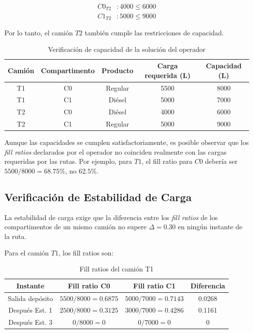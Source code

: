 \begin{align*}
C0_{T2} &: 4000 \leq 6000 \\
C1_{T2} &: 5000 \leq 9000
\end{align*}

Por lo tanto, el camión $T2$ también cumple las restricciones de capacidad.

\begin{table}[H]
\centering
\caption{Verificación de capacidad de la solución del operador}
\begin{tabular}{ccccc}
\toprule
Camión & Compartimento & Producto & Carga requerida (L) & Capacidad (L) \\
\midrule
T1 & C0 & Regular & 5500 & 8000 \\
T1 & C1 & Diésel & 5000 & 7000 \\
T2 & C0 & Diésel & 4000 & 6000 \\
T2 & C1 & Regular & 5000 & 9000 \\
\bottomrule
\end{tabular}
\end{table}

Aunque las capacidades se cumplen satisfactoriamente, es posible observar que los \textit{fill ratios} declarados por el operador no coinciden realmente con las cargas requeridas por las rutas. Por ejemplo, para $T1$, el fill ratio para $C0$ debería ser $5500/8000 = 68.75\%$, no $62.5\%$.

\subsection{Verificación de Estabilidad de Carga}

La estabilidad de carga exige que la diferencia entre los \textit{fill ratios} de los compartimentos de un mismo camión no supere $\Delta = 0.30$ en ningún instante de la ruta.

Para el camión $T1$, los fill ratios son:

\begin{table}[H]
\centering
\caption{Fill ratios del camión T1}
\begin{tabular}{cccc}
\toprule
Instante & Fill ratio C0 & Fill ratio C1 & Diferencia \\
\midrule
Salida depósito & $5500/8000 = 0.6875$ & $5000/7000 = 0.7143$ & 0.0268 \\
Después Est. 1 & $2500/8000 = 0.3125$ & $3000/7000 = 0.4286$ & 0.1161 \\
Después Est. 3 & $0/8000 = 0$ & $0/7000 = 0$ & 0 \\
\bottomrule
\end{tabular}
\end{table}

